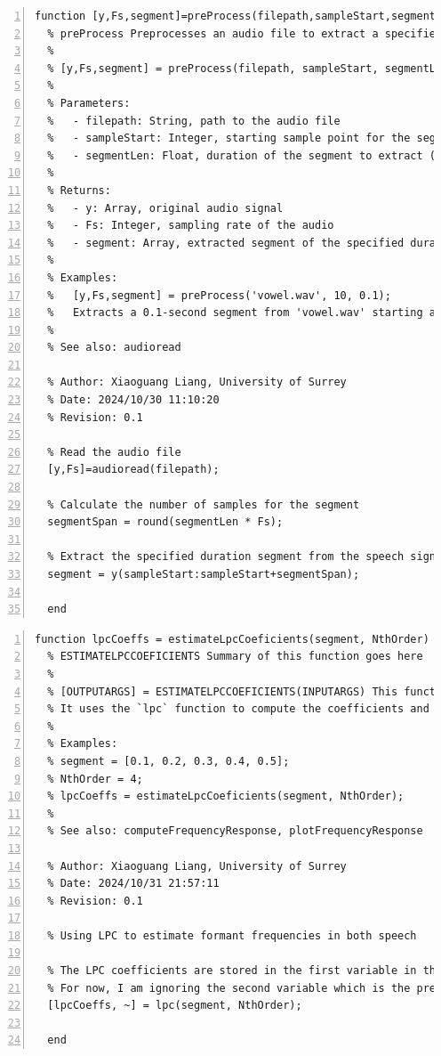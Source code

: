 \documentclass{article}
\begin{document}
\begin{lstlisting}[frame=single, numbers=left, style=Matlab-editor, caption={preProcess.m}, label={lst:preProcess}]
  function [y,Fs,segment]=preProcess(filepath,sampleStart,segmentLen)
  % preProcess Preprocesses an audio file to extract a specified duration segment
  %
  % [y,Fs,segment] = preProcess(filepath, sampleStart, segmentLen) Reads an audio file and extracts a segment of specified duration starting from a given sample point.
  %
  % Parameters:
  %   - filepath: String, path to the audio file
  %   - sampleStart: Integer, starting sample point for the segment extraction
  %   - segmentLen: Float, duration of the segment to extract (in seconds)
  %
  % Returns:
  %   - y: Array, original audio signal
  %   - Fs: Integer, sampling rate of the audio
  %   - segment: Array, extracted segment of the specified duration
  %
  % Examples:
  %   [y,Fs,segment] = preProcess('vowel.wav', 10, 0.1);
  %   Extracts a 0.1-second segment from 'vowel.wav' starting at the 10th sample point.
  %
  % See also: audioread
  
  % Author: Xiaoguang Liang, University of Surrey
  % Date: 2024/10/30 11:10:20
  % Revision: 0.1
  
  % Read the audio file
  [y,Fs]=audioread(filepath);
  
  % Calculate the number of samples for the segment
  segmentSpan = round(segmentLen * Fs);
  
  % Extract the specified duration segment from the speech signal
  segment = y(sampleStart:sampleStart+segmentSpan);
  
  end

\end{lstlisting}

\begin{lstlisting}[frame=single, numbers=left, style=Matlab-editor, caption={estimateLpcCoeficients.m}, label={lst:estimateLpcCoeficients}]
  function lpcCoeffs = estimateLpcCoeficients(segment, NthOrder)
  % ESTIMATELPCCOEFICIENTS Summary of this function goes here
  %
  % [OUTPUTARGS] = ESTIMATELPCCOEFICIENTS(INPUTARGS) This function estimates the Linear Predictive Coding (LPC) coefficients for a given speech segment.
  % It uses the `lpc` function to compute the coefficients and ignores the prediction error.
  %
  % Examples:
  % segment = [0.1, 0.2, 0.3, 0.4, 0.5];
  % NthOrder = 4;
  % lpcCoeffs = estimateLpcCoeficients(segment, NthOrder);
  %
  % See also: computeFrequencyResponse, plotFrequencyResponse
  
  % Author: Xiaoguang Liang, University of Surrey
  % Date: 2024/10/31 21:57:11
  % Revision: 0.1
  
  % Using LPC to estimate formant frequencies in both speech
  
  % The LPC coefficients are stored in the first variable in the vector.
  % For now, I am ignoring the second variable which is the prediction error.
  [lpcCoeffs, ~] = lpc(segment, NthOrder);
  
  end

\end{lstlisting}
\end{document}
